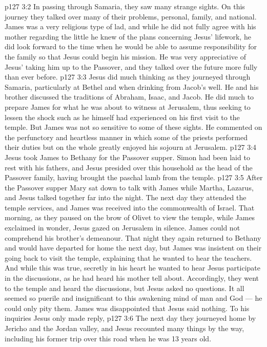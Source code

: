 \vs p127 3:2 In passing through Samaria, they saw many strange sights. On this journey they talked over many of their problems, personal, family, and national. James was a very religious type of lad, and while he did not fully agree with his mother regarding the little he knew of the plans concerning Jesus’ lifework, he did look forward to the time when he would be able to assume responsibility for the family so that Jesus could begin his mission. He was very appreciative of Jesus’ taking him up to the Passover, and they talked over the future more fully than ever before.
\vs p127 3:3 Jesus did much thinking as they journeyed through Samaria, particularly at Bethel and when drinking from Jacob’s well. He and his brother discussed the traditions of Abraham, Isaac, and Jacob. He did much to prepare James for what he was about to witness at Jerusalem, thus seeking to lessen the shock such as he himself had experienced on his first visit to the temple. But James was not so sensitive to some of these sights. He commented on the perfunctory and heartless manner in which some of the priests performed their duties but on the whole greatly enjoyed his sojourn at Jerusalem.
\vs p127 3:4 Jesus took James to Bethany for the Passover supper. Simon had been laid to rest with his fathers, and Jesus presided over this household as the head of the Passover family, having brought the paschal lamb from the temple.
\vs p127 3:5 After the Passover supper Mary sat down to talk with James while Martha, Lazarus, and Jesus talked together far into the night. The next day they attended the temple services, and James was received into the commonwealth of Israel. That morning, as they paused on the brow of Olivet to view the temple, while James exclaimed in wonder, Jesus gazed on Jerusalem in silence. James could not comprehend his brother’s demeanour. That night they again returned to Bethany and would have departed for home the next day, but James was insistent on their going back to visit the temple, explaining that he wanted to hear the teachers. And while this was true, secretly in his heart he wanted to hear Jesus participate in the discussions, as he had heard his mother tell about. Accordingly, they went to the temple and heard the discussions, but Jesus asked no questions. It all seemed so puerile and insignificant to this awakening mind of man and God --- he could only pity them. James was disappointed that Jesus said nothing. To his inquiries Jesus only made reply, 
\vs p127 3:6 The next day they journeyed home by Jericho and the Jordan valley, and Jesus recounted many things by the way, including his former trip over this road when he was 13 years old.
